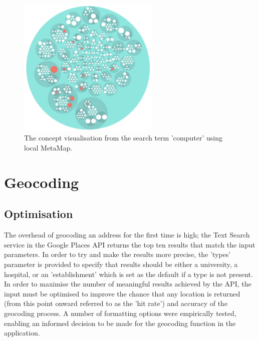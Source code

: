 \documentclass[Report.tex]{subfiles}
\begin{document}
\begin{figure}[h!]
\begin{center}
\includegraphics[width=0.6\textwidth]{../lib/images/mm-screen.png}
\caption{The concept visualisation from the search term 'computer' using local MetaMap.}
\label{fig:mm-screen}
\end{center}
\end{figure}

\section{Geocoding}
\subsection{Optimisation}
The overhead of geocoding an address for the first time is high; the Text Search service in the Google Places API returns the top ten results that match the input parameters. In order to try and make the results more precise, the 'types' parameter is provided to specify that results should be either a university, a hospital, or an 'establishment' which is set as the default if a type is not present. In order to maximise the number of meaningful results achieved by the API, the input must be optimised to improve the chance that any location is returned (from this point onward referred to as the 'hit rate') and accuracy of the geocoding process. A number of formatting options were empirically tested, enabling an informed decision to be made for the geocoding function in the application.\newline
\end{document}
